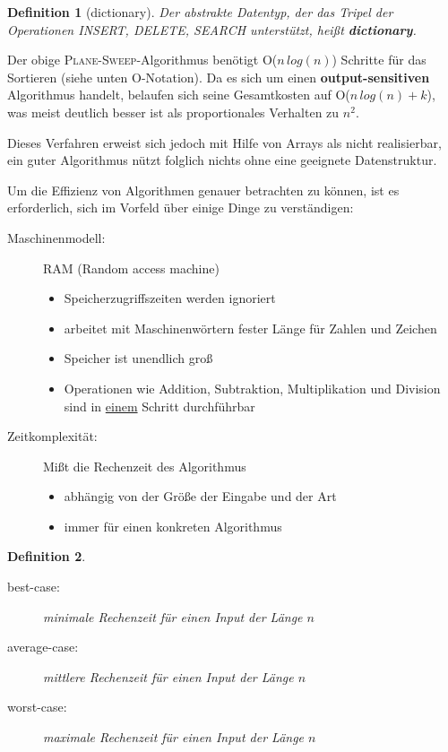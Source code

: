 \documentclass{scrreprt}%
\theoremstyle{break}
\newtheorem{definition}{Definition}
\begin{document}
\begin{definition}[dictionary]
  Der abstrakte Datentyp, der das Tripel der Operationen \textit{INSERT},
  \textit{DELETE}, \textit{SEARCH} unterstützt, heißt \textbf{dictionary}.
\end{definition}

Der obige \textsc{Plane-Sweep}-Algorithmus benötigt O($n\,log(n)$) Schritte
für das Sortieren (siehe unten O-Notation). Da es sich um einen \textbf{output-sensitiven}
Algorithmus handelt, belaufen sich seine Gesamtkosten auf
O($n\,log(n)+k$), was meist deutlich besser ist als proportionales Verhalten
zu $n^2$.

Dieses Verfahren erweist sich jedoch mit Hilfe von Arrays als nicht
realisierbar, ein guter Algorithmus nützt folglich nichts ohne eine
geeignete Datenstruktur.

Um die Effizienz von Algorithmen genauer betrachten zu können, ist es
erforderlich, sich im Vorfeld über einige Dinge zu verständigen:

\begin{description}
 \item[Maschinenmodell:] RAM (Random access machine)
  \begin{itemize}
   \item Speicherzugriffszeiten werden ignoriert
   \item arbeitet mit Maschinenwörtern fester Länge für Zahlen und Zeichen
   \item Speicher ist unendlich groß
   \item Operationen wie Addition, Subtraktion, Multiplikation und Division
    sind in \underline{einem} Schritt durchführbar
  \end{itemize}
 \item[Zeitkomplexität:] Mißt die Rechenzeit des Algorithmus
  \begin{itemize}
   \item{abhängig von der Größe der Eingabe und der Art}
   \item{immer für einen konkreten Algorithmus}
  \end{itemize}
\end{description}

\begin{definition}
  \begin{description}
   \item[best-case:] minimale Rechenzeit für einen Input der Länge $n$
   \item[average-case:] mittlere Rechenzeit für einen Input der Länge $n$
   \item[worst-case:] maximale Rechenzeit für einen Input der Länge $n$
  \end{description}
\end{definition}
\end{document}
